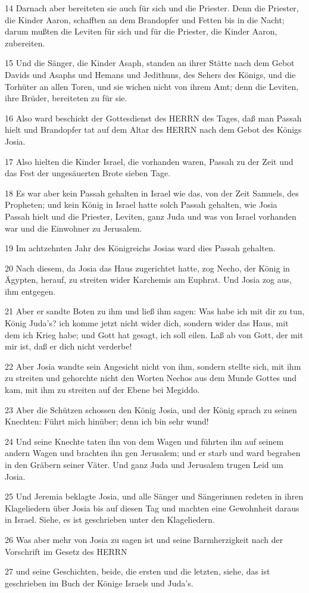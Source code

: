 \par 14 Darnach aber bereiteten sie auch für sich und die Priester. Denn die Priester, die Kinder Aaron, schafften an dem Brandopfer und Fetten bis in die Nacht; darum mußten die Leviten für sich und für die Priester, die Kinder Aaron, zubereiten.
\par 15 Und die Sänger, die Kinder Asaph, standen an ihrer Stätte nach dem Gebot Davids und Asaphs und Hemans und Jedithuns, des Sehers des Königs, und die Torhüter an allen Toren, und sie wichen nicht von ihrem Amt; denn die Leviten, ihre Brüder, bereiteten zu für sie.
\par 16 Also ward beschickt der Gottesdienst des HERRN des Tages, daß man Passah hielt und Brandopfer tat auf dem Altar des HERRN nach dem Gebot des Königs Josia.
\par 17 Also hielten die Kinder Israel, die vorhanden waren, Passah zu der Zeit und das Fest der ungesäuerten Brote sieben Tage.
\par 18 Es war aber kein Passah gehalten in Israel wie das, von der Zeit Samuels, des Propheten; und kein König in Israel hatte solch Passah gehalten, wie Josia Passah hielt und die Priester, Leviten, ganz Juda und was von Israel vorhanden war und die Einwohner zu Jerusalem.
\par 19 Im achtzehnten Jahr des Königreichs Josias ward dies Passah gehalten.
\par 20 Nach diesem, da Josia das Haus zugerichtet hatte, zog Necho, der König in Ägypten, herauf, zu streiten wider Karchemis am Euphrat. Und Josia zog aus, ihm entgegen.
\par 21 Aber er sandte Boten zu ihm und ließ ihm sagen: Was habe ich mit dir zu tun, König Juda's? ich komme jetzt nicht wider dich, sondern wider das Haus, mit dem ich Krieg habe; und Gott hat gesagt, ich soll eilen. Laß ab von Gott, der mit mir ist, daß er dich nicht verderbe!
\par 22 Aber Josia wandte sein Angesicht nicht von ihm, sondern stellte sich, mit ihm zu streiten und gehorchte nicht den Worten Nechos aus dem Munde Gottes und kam, mit ihm zu streiten auf der Ebene bei Megiddo.
\par 23 Aber die Schützen schossen den König Josia, und der König sprach zu seinen Knechten: Führt mich hinüber; denn ich bin sehr wund!
\par 24 Und seine Knechte taten ihn von dem Wagen und führten ihn auf seinem andern Wagen und brachten ihn gen Jerusalem; und er starb und ward begraben in den Gräbern seiner Väter. Und ganz Juda und Jerusalem trugen Leid um Josia.
\par 25 Und Jeremia beklagte Josia, und alle Sänger und Sängerinnen redeten in ihren Klageliedern über Josia bis auf diesen Tag und machten eine Gewohnheit daraus in Israel. Siehe, es ist geschrieben unter den Klageliedern.
\par 26 Was aber mehr von Josia zu sagen ist und seine Barmherzigkeit nach der Vorschrift im Gesetz des HERRN
\par 27 und seine Geschichten, beide, die ersten und die letzten, siehe, das ist geschrieben im Buch der Könige Israels und Juda's.

